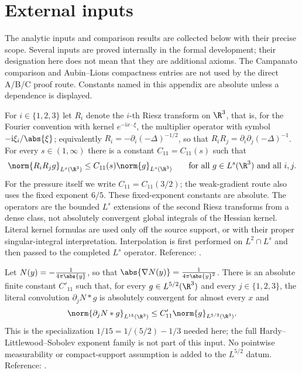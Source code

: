 \documentclass[11pt,reqno]{amsart}
\begin{document}

\appendix

\section{External inputs}\label{sec:external}

The analytic inputs and comparison results are collected below with their
precise scope. Several inputs are proved internally in the formal development;
their designation here does not mean that they are additional axioms.
The Campanato comparison and Aubin--Lions compactness entries are not used
by the direct A/B/C proof route. Constants named in this
appendix are absolute unless a dependence is displayed.

\begin{externalinput}\label{ext:CZ}
For $i\in\{1,2,3\}$ let $R_{i}$ denote the $i$-th Riesz transform on $\R^{3}$,
that is, for the Fourier convention with kernel $e^{-\mathrm{i}x\cdot\xi}$,
the multiplier operator with symbol $-\mathrm{i}\xi_{i}/\abs{\xi}$;
equivalently $R_{i}=-\partial_{i}(-\Delta)^{-1/2}$, so that
$R_{i}R_{j}=\partial_{i}\partial_{j}(-\Delta)^{-1}$. For every $s\in(1,\infty)$
there is a constant $C_{11}=C_{11}(s)$ such that
\[
  \norm{R_{i}R_{j}g}_{L^{s}(\R^{3})}\le C_{11}(s)\norm{g}_{L^{s}(\R^{3})}
  \qquad\text{for all }g\in L^{s}(\R^{3})\text{ and all }i,j .
\]
For the pressure itself we write $C_{11}=C_{11}(3/2)$; the weak-gradient
route also uses the fixed exponent $6/5$. These fixed-exponent constants
are absolute. The operators are the bounded $L^s$ extensions of the
second Riesz transforms from a dense class, not absolutely convergent
global integrals of the Hessian kernel. Literal kernel formulas are used
only off the source support, or with their proper singular-integral
interpretation. Interpolation is first performed on $L^2\cap L^s$ and
then passed to the completed $L^s$ operator.
Reference: \cite[Ch.~II--III]{Stein1970}.
\end{externalinput}

\begin{externalinput}
\label{ext:riesz}
Let $N(y)=-\tfrac1{4\pi\abs{y}}$, so that $\abs{\nabla N(y)}=\tfrac1{4\pi\abs{y}^{2}}$.
There is an absolute finite constant $C'_{11}$ such that, for every
$g\in L^{5/2}(\R^3)$ and every $j\in\{1,2,3\}$, the literal convolution
$\partial_jN*g$ is absolutely convergent for almost every $x$ and
\[
  \norm{\partial_jN*g}_{L^{15}(\R^3)}
      \le C'_{11}\norm{g}_{L^{5/2}(\R^3)} .
\]
This is the specialization $1/15=1/(5/2)-1/3$ needed here; the full
Hardy--Littlewood--Sobolev exponent family is not part of this input.
No pointwise measurability or compact-support assumption is added to the
$L^{5/2}$ datum.
Reference: \cite[Ch.~V, Thm.~1]{Stein1970}.
\end{externalinput}
\end{document}
